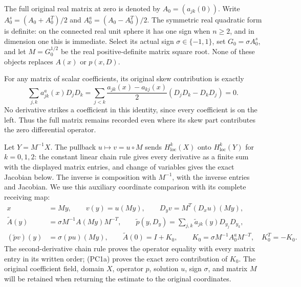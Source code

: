 \documentclass[
  11pt,
]{article}
\begin{document}
The full original real matrix at zero is denoted by \(A_0=(a_{jk}(0))\).
Write \(A_0^s=(A_0+A_0^T)/2\) and \(A_0^a=(A_0-A_0^T)/2\). The symmetric
real quadratic form is definite: on the connected real unit sphere it
has one sign when \(n\geq2\), and in dimension one this is immediate.
Select its actual sign \(\sigma\in\{-1,1\}\), set \(G_0=\sigma A_0^s\),
and let \(M=G_0^{1/2}\) be the real positive-definite matrix square
root. None of these objects replaces \(A(x)\) or \(p(x,D)\).

For any matrix of scalar coefficients, its original skew contribution is
exactly \[
 \sum_{j,k}a_{jk}^a(x)D_jD_k
 =\sum_{j<k}\frac{a_{jk}(x)-a_{kj}(x)}2
                   (D_jD_k-D_kD_j)=0.                 \tag{PC1a}
\] No derivative strikes a coefficient in this identity, since every
coefficient is on the left. Thus the full matrix remains recorded even
where its skew part contributes the zero differential operator.

Let \(Y=M^{-1}X\). The pullback \(u\mapsto v=u\circ M\) sends
\(H^k_{\mathrm{loc}}(X)\) onto \(H^k_{\mathrm{loc}}(Y)\) for
\(k=0,1,2\): the constant linear chain rule gives every derivative as a
finite sum with the displayed matrix entries, and change of variables
gives the exact Jacobian below. The inverse is composition with
\(M^{-1}\), with the inverse entries and Jacobian. We use this auxiliary
coordinate comparison with its complete receiving map: \[
 \begin{split}
 x&=My,\qquad v(y)=u(My),\qquad D_yv=M^T(D_xu)(My),\\
 \widetilde A(y)&=\sigma M^{-1}A(My)M^{-T},\qquad
 \widetilde p(y,D_y)=\sum_{j,k}\widetilde a_{jk}(y)D_{y_j}D_{y_k},\\
 (\widetilde p v)(y)&=\sigma(pu)(My),\qquad
 \widetilde A(0)=I+K_0,\qquad
 K_0=\sigma M^{-1}A_0^aM^{-T},\quad K_0^T=-K_0.
 \end{split}                                                   \tag{PC6}
\] The second-derivative chain rule proves the operator equality with
every matrix entry in its written order; (PC1a) proves the exact zero
contribution of \(K_0\). The original coefficient field, domain \(X\),
operator \(p\), solution \(u\), sign \(\sigma\), and matrix \(M\) will
be retained when returning the estimate to the original coordinates.
\end{document}
